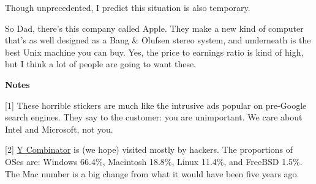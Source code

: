 Though unprecedented, I predict this situation is also temporary.

So Dad, there's this company called Apple. They make a new kind of
computer that's as well designed as a Bang \& Olufsen stereo system, and
underneath is the best Unix machine you can buy. Yes, the price to
earnings ratio is kind of high, but I think a lot of people are going to
want these.

\textbf{Notes}

{[}1{]} These horrible stickers are much like the intrusive ads popular
on pre-Google search engines. They say to the customer: you are
unimportant. We care about Intel and Microsoft, not you.

{[}2{]} \href{http://ycombinator.com}{Y Combinator} is (we hope) visited
mostly by hackers. The proportions of OSes are: Windows 66.4\%,
Macintosh 18.8\%, Linux 11.4\%, and FreeBSD 1.5\%. The Mac number is a
big change from what it would have been five years ago.
